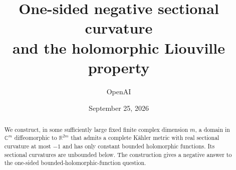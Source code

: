 \documentclass[11pt]{article}
\title{One-sided negative sectional curvature\\and the holomorphic Liouville property}
\author{OpenAI}
\date{September 25, 2026}
\numberwithin{equation}{section}
\theoremstyle{definition}
\theoremstyle{remark}
\begin{document}
\maketitle
\begin{abstract}
We construct, in some sufficiently large fixed finite complex dimension
$m$, a domain in $\mathbb C^m$ diffeomorphic to $\mathbb R^{2m}$ that
admits a complete K\"ahler metric with real sectional curvature at most
$-1$ and has only constant bounded holomorphic functions. Its sectional
curvatures are unbounded below. The construction gives a negative answer
to the one-sided bounded-holomorphic-function question.
\end{abstract}
\clearpage
\begingroup
\small
\tableofcontents
\endgroup
\clearpage










\end{document}
